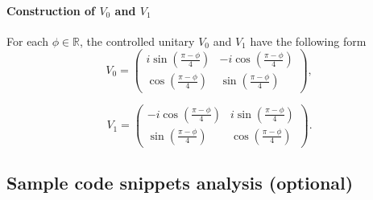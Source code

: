 \documentclass[preprint,12pt, a4paper]{elsarticle}
\newcommand{\ket}[1]{\ensuremath{|#1\rangle}}
\newcommand{\1}{{\rm 1\hspace{-0.9mm}l}}
\newcommand{\Id}{{\rm 1\hspace{-0.9mm}l}}
\newcommand{\ee}{\ensuremath{\mathrm{e}}}
\newcommand{\ii}{\ensuremath{\mathrm{i}}}
\newcommand{\PP}{\mathcal{P}}
\begin{document}



\paragraph{Construction of $V_0$ and $V_1$}
	For each $\phi \in \mathbb{R}$,  the controlled unitary $V_0$ and $V_1$ 
	have the following form
	\begin{equation}
	V_0 = \left(\begin{array}{cc}i \sin\left( \frac{\pi - \phi}{4} \right)&-i 
	\cos\left( \frac{\pi - \phi}{4} \right)\\ \cos\left( \frac{\pi - 
	\phi}{4}\right)& \sin\left( \frac{\pi - \phi}{4} \right)\end{array}\right),
	\end{equation}
	
		\begin{equation}
	V_1 = \left(\begin{array}{cc}-i \cos\left(\frac{\pi - \phi}{4}\right) &i 
	\sin\left( \frac{\pi - \phi}{4}\right)\\\sin\left( \frac{\pi - \phi}{4} 
	\right) &  \cos\left( \frac{\pi - \phi}{4} \right) \end{array}\right).
	\end{equation}




\subsection{Sample code snippets analysis (optional)}
\label{}




\end{document}
